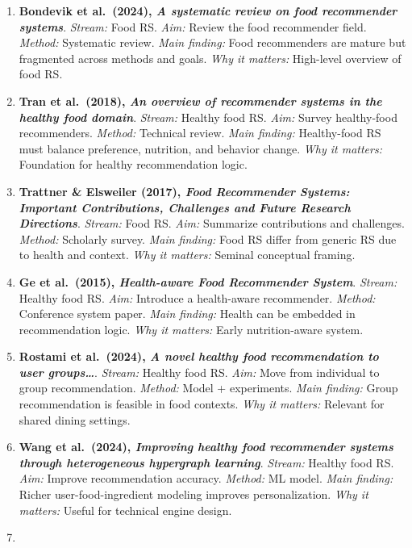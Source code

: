 \documentclass[
  letterpaper,
  DIV=11,
  numbers=noendperiod]{scrartcl}
\providecommand{\tightlist}{%
  \setlength{\itemsep}{0pt}\setlength{\parskip}{0pt}}
\begin{document}
\begin{enumerate}
\def\labelenumi{\arabic{enumi}.}
\tightlist
\item
  \textbf{Bondevik et al.~(2024), \emph{A systematic review on food
  recommender systems}}. \emph{Stream:} Food RS. \emph{Aim:} Review the
  food recommender field. \emph{Method:} Systematic review. \emph{Main
  finding:} Food recommenders are mature but fragmented across methods
  and goals. \emph{Why it matters:} High-level overview of food RS.
\item
  \textbf{Tran et al.~(2018), \emph{An overview of recommender systems
  in the healthy food domain}}. \emph{Stream:} Healthy food RS.
  \emph{Aim:} Survey healthy-food recommenders. \emph{Method:} Technical
  review. \emph{Main finding:} Healthy-food RS must balance preference,
  nutrition, and behavior change. \emph{Why it matters:} Foundation for
  healthy recommendation logic.
\item
  \textbf{Trattner \& Elsweiler (2017), \emph{Food Recommender Systems:
  Important Contributions, Challenges and Future Research Directions}}.
  \emph{Stream:} Food RS. \emph{Aim:} Summarize contributions and
  challenges. \emph{Method:} Scholarly survey. \emph{Main finding:} Food
  RS differ from generic RS due to health and context. \emph{Why it
  matters:} Seminal conceptual framing.
\item
  \textbf{Ge et al.~(2015), \emph{Health-aware Food Recommender
  System}}. \emph{Stream:} Healthy food RS. \emph{Aim:} Introduce a
  health-aware recommender. \emph{Method:} Conference system paper.
  \emph{Main finding:} Health can be embedded in recommendation logic.
  \emph{Why it matters:} Early nutrition-aware system.
\item
  \textbf{Rostami et al.~(2024), \emph{A novel healthy food
  recommendation to user groups\ldots{}}}. \emph{Stream:} Healthy food
  RS. \emph{Aim:} Move from individual to group recommendation.
  \emph{Method:} Model + experiments. \emph{Main finding:} Group
  recommendation is feasible in food contexts. \emph{Why it matters:}
  Relevant for shared dining settings.
\item
  \textbf{Wang et al.~(2024), \emph{Improving healthy food recommender
  systems through heterogeneous hypergraph learning}}. \emph{Stream:}
  Healthy food RS. \emph{Aim:} Improve recommendation accuracy.
  \emph{Method:} ML model. \emph{Main finding:} Richer
  user-food-ingredient modeling improves personalization. \emph{Why it
  matters:} Useful for technical engine design.
\item

\end{enumerate}
\end{document}
